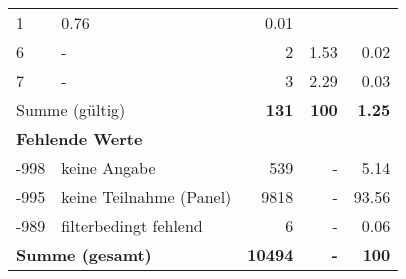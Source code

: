 \begin{longtable}{lXrrr}
       \num{1} &
       \num[round-mode=places,round-precision=2]{0,76} &
         \num[round-mode=places,round-precision=2]{0,01} \\

     6 &
     \multicolumn{1}{X}{ -  } &


       \num{2} &
       \num[round-mode=places,round-precision=2]{1,53} &
         \num[round-mode=places,round-precision=2]{0,02} \\

     7 &
     \multicolumn{1}{X}{ -  } &


       \num{3} &
       \num[round-mode=places,round-precision=2]{2,29} &
         \num[round-mode=places,round-precision=2]{0,03} \\
     \midrule
     \multicolumn{2}{l}{Summe (gültig)} &
       \textbf{\num{131}} &
     \textbf{100} &
       \textbf{\num[round-mode=places,round-precision=2]{1,25}} \\
     \multicolumn{5}{l}{\textbf{Fehlende Werte}}\\
       -998 &
       keine Angabe &
         \num{539} &
        - &
         \num[round-mode=places,round-precision=2]{5,14} \\
       -995 &
       keine Teilnahme (Panel) &
         \num{9818} &
        - &
         \num[round-mode=places,round-precision=2]{93,56} \\
       -989 &
       filterbedingt fehlend &
         \num{6} &
        - &
         \num[round-mode=places,round-precision=2]{0,06} \\
     \midrule
     \multicolumn{2}{l}{\textbf{Summe (gesamt)}} &
          \textbf{\num{10494}} &
        \textbf{-} &
        \textbf{100} \\
     \bottomrule
     \end{longtable}
     
